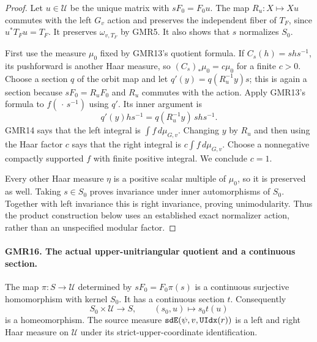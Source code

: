 \documentclass[11pt,a4paper]{article}
\numberwithin{equation}{section}
\theoremstyle{remark}\newtheorem{remark}[theorem]{Remark}
\begin{document}
\begin{proof}
Let $u\in\mathcal U$ be the unique matrix with $sF_0=F_0u$.
The map $R_u:X\mapsto Xu$ commutes with the left $G_v$ action and
preserves the independent fiber of $T_F$, since $u^*T_Fu=T_F$.
It preserves $\omega_{v,T_F}$ by GMR5.  It also shows that $s$
normalizes $S_0$.

First use the measure $\mu_0$ fixed by GMR13's quotient formula.
If $C_s(h)=shs^{-1}$, its pushforward is another Haar measure,
so $(C_s)_*\mu_0=c\mu_0$ for a finite $c>0$.
Choose a section $q$ of the orbit map and let
$q'(y)=q(R_u^{-1}y)s$; this is again a section because
$sF_0=R_uF_0$ and $R_u$ commutes with the action.
Apply GMR13's formula to $f(\,\cdot\,s^{-1})$ using $q'$.
Its inner argument is
\[
 q'(y)h s^{-1}=q(R_u^{-1}y)\,s h s^{-1}.
\]
GMR14 says that the left integral is $\int f\,d\mu_{G,v}$.
Changing $y$ by $R_u$ and then using the Haar factor $c$ says that
the right integral is $c\int f\,d\mu_{G,v}$.
Choose a nonnegative compactly supported $f$ with finite positive
integral.  We conclude $c=1$.

Every other Haar measure $\eta$ is a positive scalar multiple of
$\mu_0$, so it is preserved as well.  Taking $s\in S_0$ proves
invariance under inner automorphisms of $S_0$.  Together with left
invariance this is right invariance, proving unimodularity.
Thus the product construction below uses an established exact
normalizer action, rather than an unspecified modular factor.
\end{proof}

\paragraph{GMR16. The actual upper-unitriangular quotient and a continuous section.}
\label{claim:GMR16}
The map $\pi:S\to\mathcal U$ determined by $sF_0=F_0\pi(s)$ is a
continuous surjective homomorphism with kernel $S_0$.  It has a
continuous section $t$.  Consequently
\[
 S_0\times\mathcal U\longrightarrow S,\qquad (s_0,u)\longmapsto s_0t(u)
 \tag{GMR.22}
\]
is a homeomorphism.  The source measure
$\texttt{sd\allowbreak E}(\psi,v,\texttt{UIdx}(r))$ is a left and right Haar measure
on $\mathcal U$ under its strict-upper-coordinate identification.
\end{document}
